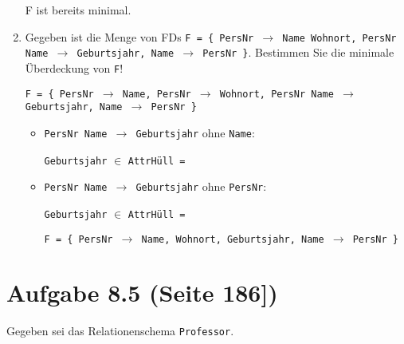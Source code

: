 \documentclass{bschlangaul-haupt}
\begin{document}
\begin{enumerate}
\begin{liAntwort}
\begin{enumerate}
\end{enumerate}
F ist bereits minimal.
\end{liAntwort}

%

\item Gegeben ist die Menge von FDs \texttt{F = \{%
  PersNr $\rightarrow$ Name Wohnort,
  PersNr Name $\rightarrow$ Geburtsjahr,
  Name $\rightarrow$ PersNr%
\}}.
Bestimmen Sie die minimale Überdeckung von \texttt{F}!

\begin{liAntwort}
\texttt{F = \{%
  PersNr $\rightarrow$ Name,
  PersNr $\rightarrow$ Wohnort,
  PersNr Name $\rightarrow$ Geburtsjahr,
  Name $\rightarrow$ PersNr%
\}}

\begin{itemize}
\item \texttt{PersNr Name $\rightarrow$ Geburtsjahr} ohne \texttt{Name}:

\texttt{Geburtsjahr} $\in$ \texttt{AttrHüll = }

\item \texttt{PersNr Name $\rightarrow$ Geburtsjahr} ohne \texttt{PersNr}:

\texttt{Geburtsjahr} $\in$ \texttt{AttrHüll = }

\texttt{F = \{%
  PersNr $\rightarrow$ Name, Wohnort, Geburtsjahr,
  Name $\rightarrow$ PersNr%
\}}
\end{itemize}

\end{liAntwort}

\end{enumerate}

%

\section{Aufgabe 8.5 (Seite 186])}

Gegeben sei das Relationenschema \texttt{Professor}.
\end{document}
